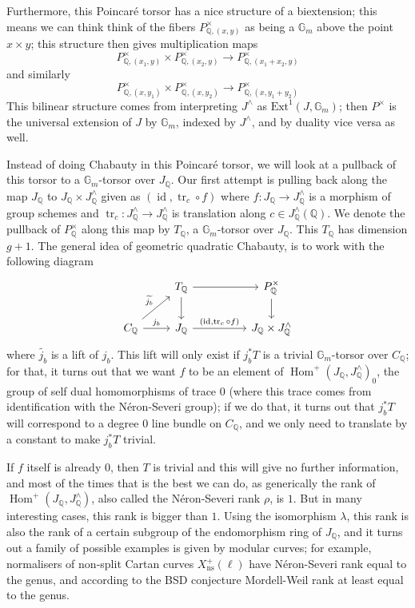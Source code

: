 \documentclass[12pt]{article}
\renewcommand{\G}{\mathbb{G}}
\newcommand{\Q}{\mathbb{Q}}
\DeclareMathOperator{\Hom}{Hom}
\DeclareMathOperator{\id}{id}
\DeclareMathOperator{\tr}{tr}
\theoremstyle{plain}
\theoremstyle{definition}
\theoremstyle{remark}
\begin{document}
Furthermore, this Poincar\'e torsor has a nice structure of a biextension; this means we can think think of the fibers $P^\times_{\Q,(x,y)}$ as being a $\G_m$ above the point $x \times y$; this structure then gives multiplication maps \[P^\times_{\Q,(x_1,y)} \times P^\times_{\Q,(x_2,y)} \to P^\times_{\Q,(x_1+x_2,y)}\] and similarly \[P^\times_{\Q,(x,y_1)} \times P^\times_{\Q,(x,y_2)} \to P^\times_{\Q,(x,y_1+y_2)}\]
This bilinear structure comes from interpreting $J^\wedge$ as $\text{Ext}^1(J,\G_m)$; then $P^\times$ is the universal extension of $J$ by $\G_m$, indexed by $J^\wedge$, and by duality vice versa as well.

Instead of doing Chabauty in this Poincar\'e torsor, we will look at a pullback of this torsor to a $\G_m$-torsor over $J_\Q$. Our first attempt is pulling back along the map $J_\Q$ to $J_\Q \times J^\wedge_\Q$ given as $(\id,\tr_c \circ f)$ where $f: J_\Q \to J^\wedge_\Q$ is a morphism of group schemes and $\tr_c: J^\wedge_\Q \to J^\wedge_\Q$ is translation along $c \in J^\wedge_\Q(\Q)$. We denote the pullback of $P^\times_\Q$ along this map by $T_\Q$, a $\G_m$-torsor over $J_\Q$. This $T_\Q$ has dimension $g+1$. The general idea of geometric quadratic Chabauty, is to work with the following diagram
\[\begin{tikzcd} %
                                                & T_\Q \arrow[d] \arrow[rr]                   && P_\Q^\times \arrow[d]      \\
C_\Q \arrow[ru, "\widetilde{j_b}"] \arrow[r, "j_b"] & J_\Q \arrow[rr, "{(\id,\tr_c \circ f)}"] && J_\Q \times J^\wedge_\Q
\end{tikzcd}\]
where $\widetilde{j_b}$ is a lift of $j_b$. This lift will only exist if $j_b^* T$ is a trivial $\G_m$-torsor over $C_\Q$; for that, it turns out that we want $f$ to be an element of $\Hom^+(J_\Q,J^\wedge_\Q)_0$, the group of self dual homomorphisms of trace $0$ (where this trace comes from identification with the N\'eron-Severi group); if we do that, it turns out that $j_b^* T$ will correspond to a degree $0$ line bundle on $C_\Q$, and we only need to translate by a constant to make $j_b^* T$ trivial.

If $f$ itself is already $0$, then $T$ is trivial and this will give no further information, and most of the times that is the best we can do, as generically the rank of $\Hom^+(J_\Q,J^\wedge_\Q)$, also called the N\'eron-Severi rank $\rho$, is $1$. But in many interesting cases, this rank is bigger than $1$. Using the isomorphism $\lambda$, this rank is also the rank of a certain subgroup of the endomorphism ring of $J_\Q$, and it turns out a family of possible examples is given by modular curves; for example, normalisers of non-split Cartan curves $X_{\text{ns}}^+(\ell)$ have N\'eron-Severi rank equal to the genus, and according to the BSD conjecture Mordell-Weil rank at least equal to the genus.
\end{document}
